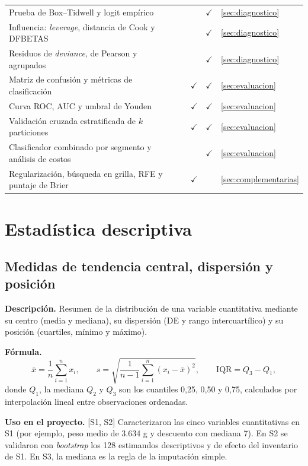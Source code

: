 \documentclass[11pt,a4paper]{article}
\newcommand{\desc}{\textbf{Descripción.} }
\newcommand{\formula}{\textbf{Fórmula.} }
\newcommand{\uso}{\textbf{Uso en el proyecto.} }
\newcommand{\fase}[1]{{\footnotesize\color{gris}[#1]}}
\begin{document}
{\begin{longtable}{@{}p{7.3cm} c c c c p{3.6cm}@{}}
Prueba de Box--Tidwell y logit empírico & & & & $\checkmark$ & \ref{sec:diagnostico}\\
Influencia: \emph{leverage}, distancia de Cook y DFBETAS & & & & $\checkmark$ & \ref{sec:diagnostico}\\
Residuos de \emph{deviance}, de Pearson y agrupados & & & & $\checkmark$ & \ref{sec:diagnostico}\\
Matriz de confusión y métricas de clasificación & & & $\checkmark$ & $\checkmark$ & \ref{sec:evaluacion}\\
Curva ROC, AUC y umbral de Youden & & & $\checkmark$ & $\checkmark$ & \ref{sec:evaluacion}\\
Validación cruzada estratificada de $k$ particiones & & & $\checkmark$ & $\checkmark$ & \ref{sec:evaluacion}\\
Clasificador combinado por segmento y análisis de costos & & & & $\checkmark$ & \ref{sec:evaluacion}\\
Regularización, búsqueda en grilla, RFE y puntaje de Brier & & & $\checkmark$ & & \ref{sec:complementarias}\\
\bottomrule
\end{longtable}}

\section{Estadística descriptiva}\label{sec:descriptiva}

\subsection{Medidas de tendencia central, dispersión y posición}
\desc Resumen de la distribución de una variable cuantitativa mediante su centro (media y mediana), su dispersión (DE y rango intercuartílico) y su posición (cuartiles, mínimo y máximo).

\formula
\[
\bar x=\frac1n\sum_{i=1}^n x_i,\qquad s=\sqrt{\frac{1}{n-1}\sum_{i=1}^n (x_i-\bar x)^2},\qquad \mathrm{IQR}=Q_3-Q_1,
\]
donde $Q_1$, la mediana $Q_2$ y $Q_3$ son los cuantiles 0,25, 0,50 y 0,75, calculados por interpolación lineal entre observaciones ordenadas.

\uso \fase{S1, S2} Caracterizaron las cinco variables cuantitativas en S1 (por ejemplo, peso medio de 3.634 g y descuento con mediana 7). En S2 se validaron con \emph{bootstrap} los 128 estimandos descriptivos y de efecto del inventario de S1. En S3, la mediana es la regla de la imputación simple.
\end{document}
